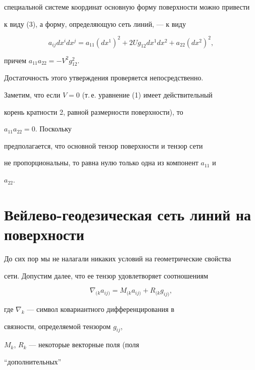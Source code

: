 специальной системе координат основную форму поверхности можно привести 


к виду (3), а форму, определяющую сеть линий, --- к виду 


$$ 


a_{ij}dx^i dx^j=a_{11}(dx^1)^2+2U g_{12}dx^1dx^2+ 


a_{22}(dx^2)^2, 


$$ 


причем $a_{11}a_{22}=-V^2g^2_{12}$. 


 


Достаточность этого утверждения проверяется непосредственно. 


 


Заметим, что если $V=0$ (т.\,е. уравнение (1) имеет действительный 


корень кратности 2, равной размерности поверхности), то 


$a_{11}a_{22}=0$. Поскольку 


предполагается, что основной тензор поверхности и тензор сети 


не пропорциональны, то равна нулю только одна из компонент $a_{11}$ и 


$a_{22}$. 


 


\section{Вейлево-геодезическая сеть линий на поверхности} 


 


До сих пор мы не налагали никаких условий на геометрические свойства  


сети. Допустим далее, что ее тензор удовлетворяет соотношениям 


\begin{equation} 


\nabla_{(k}a_{ij)}=M_{(k}a_{ij)}+R_{(k}g_{ij)}, 


\end{equation} 


где $\nabla_k$ --- символ ковариантного дифференцирования в 


связности, определяемой тензором $g_{ij}$,


$M_k$, $R_k$ --- некоторые векторные поля (поля 


``дополнительных'' 



